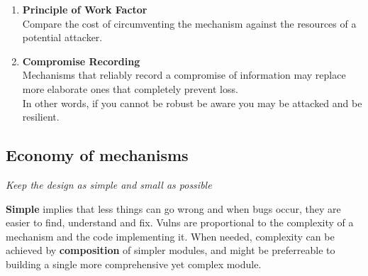{\begin{enumerate}

      \item \textbf{Principle of Work Factor}\\
      Compare the cost of circumventing the mechanism against the resources of a potential attacker.
      \item \textbf{Compromise Recording}\\
      Mechanisms that reliably record a compromise of information may replace more elaborate ones that completely prevent loss.\\
      In other words,
      if you cannot be robust be aware you may be attacked and be resilient.
   \end{enumerate}
}
\subsection{Economy of mechanisms}
\begin{center}
   \textit{Keep the design as simple and small as possible}
\end{center}

\textbf{Simple} implies that less things can go wrong and when bugs occur, they are easier to find, understand and fix.
Vulns are proportional to the complexity of a mechanism and the code implementing it.
When needed, complexity can be achieved by \textbf{composition} of simpler modules, and might be preferreable to building a single more comprehensive yet complex module.\\
